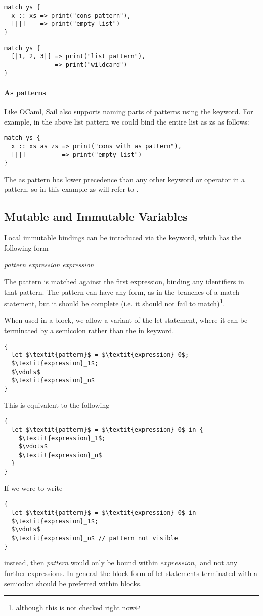 \begin{lstlisting}
match ys {
  x :: xs => print("cons pattern"),
  [||]    => print("empty list")
}
\end{lstlisting}

\begin{lstlisting}
match ys {
  [|1, 2, 3|] => print("list pattern"),
  _           => print("wildcard")
}
\end{lstlisting}

\paragraph{As patterns}

Like OCaml, Sail also supports naming parts of patterns using the
 keyword. For example, in the above list pattern we could bind
the entire list as zs as follows:
\begin{lstlisting}
match ys {
  x :: xs as zs => print("cons with as pattern"),
  [||]          => print("empty list")
}
\end{lstlisting}
The as pattern has lower precedence than any other keyword or operator
in a pattern, so in this example zs will refer to .

\subsection{Mutable and Immutable Variables}

Local immutable bindings can be introduced via the  keyword,
which has the following form
\begin{center}
   \textit{pattern} \ll{=} \textit{expression}  \textit{expression}
\end{center}
The pattern is matched against the first expression, binding any
identifiers in that pattern. The pattern can have any form, as in the
branches of a match statement, but it should be complete (i.e. it
should not fail to match)\footnote{although this is not checked right
  now}.

When used in a block, we allow a variant of the let statement, where
it can be terminated by a semicolon rather than the in keyword.
\begin{lstlisting}[mathescape]
{
  let $\textit{pattern}$ = $\textit{expression}_0$;
  $\textit{expression}_1$;
  $\vdots$
  $\textit{expression}_n$
}
\end{lstlisting}
This is equivalent to the following
\begin{lstlisting}[mathescape]
{
  let $\textit{pattern}$ = $\textit{expression}_0$ in {
    $\textit{expression}_1$;
    $\vdots$
    $\textit{expression}_n$
  }
}
\end{lstlisting}
If we were to write
\begin{lstlisting}[mathescape]
{
  let $\textit{pattern}$ = $\textit{expression}_0$ in
  $\textit{expression}_1$;
  $\vdots$
  $\textit{expression}_n$ // pattern not visible
}
\end{lstlisting}
instead, then \textit{pattern} would only be bound within
$\textit{expression}_1$ and not any further expressions. In general
the block-form of let statements terminated with a semicolon should be
preferred within blocks.


